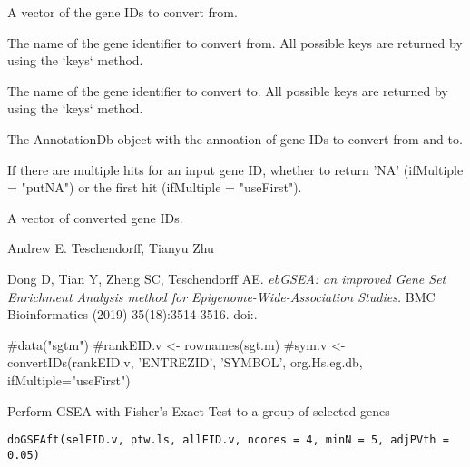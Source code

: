 \documentclass[letterpaper]{book}
\begin{document}
%
\begin{Arguments}
\begin{ldescription}
\item[\code{ids}] A vector of the gene IDs to convert from.

\item[\code{from}] The name of the gene identifier to convert from. All possible keys are returned by using the `keys` method.

\item[\code{to}] The name of the gene identifier to convert to. All possible keys are returned by using the `keys` method.

\item[\code{db}] The AnnotationDb object with the annoation of gene IDs to convert from and to.

\item[\code{ifMultiple}] If there are multiple hits for an input gene ID, whether to return 'NA' (ifMultiple = "putNA") or the first hit (ifMultiple = "useFirst").
\end{ldescription}
\end{Arguments}
%
\begin{Value}
A vector of converted gene IDs.
\end{Value}
%
\begin{Author}\relax
Andrew E. Teschendorff, Tianyu Zhu
\end{Author}
%
\begin{References}\relax
Dong D, Tian Y, Zheng SC, Teschendorff AE.
\emph{ebGSEA: an improved Gene Set Enrichment Analysis method for Epigenome-Wide-Association Studies.}
BMC Bioinformatics (2019) 35(18):3514-3516.
doi:.
\end{References}
%
\begin{Examples}
\begin{ExampleCode}
#data("sgtm")
#rankEID.v <- rownames(sgt.m)
#sym.v <- convertIDs(rankEID.v, 'ENTREZID', 'SYMBOL', org.Hs.eg.db, ifMultiple="useFirst")

\end{ExampleCode}
\end{Examples}
%
\begin{Description}\relax
Perform GSEA with Fisher's Exact Test to a group of selected genes
\end{Description}
%
\begin{Usage}
\begin{verbatim}
doGSEAft(selEID.v, ptw.ls, allEID.v, ncores = 4, minN = 5, adjPVth = 0.05)
\end{verbatim}
\end{Usage}
\end{document}
